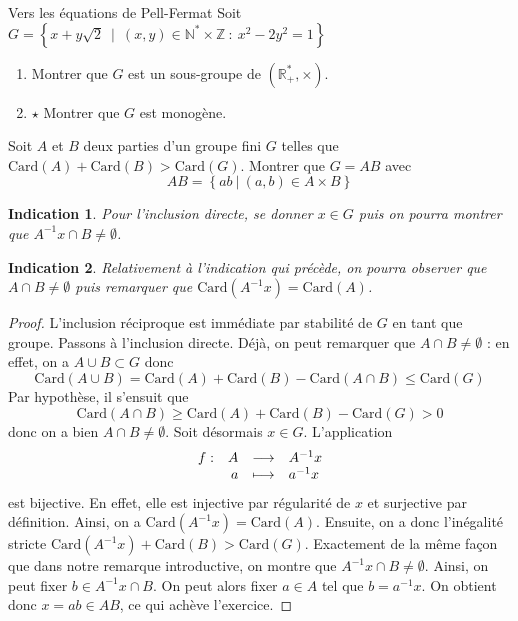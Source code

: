 \documentclass[french,a4paper]{article}
\newcommand{\N}{\mathbb{N}}
\newcommand{\Z}{\mathbb{Z}}
\newcommand{\R}{\mathbb{R}}
\newcommand{\st}{^*}
\newcommand{\inv}{^{-1}}
\newcommand{\card}{\text{Card}}
\theoremstyle{plain}
\newtheorem*{ind}{Indication}
\theoremstyle{definition}
\theoremstyle{remark}
\begin{document}
\begin{ex}[Moulin.AG.11]{Vers les équations de Pell-Fermat}
	Soit $G=\left\{x+y\sqrt{2}\ \mid \ (x,y)\in\N\st\times\Z\ : \ x^2-2y^2=1\right\}$
	\begin{enumerate}
		\item Montrer que $G$ est un sous-groupe de $(\R_+\st,\times)$.
		\item $\star$ Montrer que $G$ est monogène.
	\end{enumerate}
\end{ex}

\begin{ex}{}
	Soit $A$ et $B$ deux parties d'un groupe fini $G$ telles que $\card(A)+\card(B)>\card(G)$. Montrer que $G=AB$ avec $$AB=\left\{ab \ |\ (a,b)\in A\times B\right\}$$
\end{ex}

\begin{ind}
	Pour l'inclusion directe, se donner $x \in G$ puis on pourra montrer que $A\inv x \cap B \ne \emptyset$.
\end{ind}

\begin{ind}
	Relativement à l'indication qui précède, on pourra observer que $A\cap B \ne \emptyset$ puis remarquer que $\card(A\inv x) = \card(A)$.
\end{ind}

\begin{proof}
	L'inclusion réciproque est immédiate par stabilité de $G$ en tant que groupe. Passons à l'inclusion directe. Déjà, on peut remarquer que $A\cap B \ne \emptyset$ : en effet, on a $A\cup B \subset G$ donc $$\card(A\cup B)=\card(A)+\card(B)-\card(A\cap B) \leqslant\card(G)$$ Par hypothèse, il s'ensuit que $$\card(A\cap B) \geqslant \card(A)+\card(B)-\card(G)>0$$ donc on a bien $A\cap B \ne \emptyset$. Soit désormais $x \in G$. L'application $$
	\begin{array}[t]{lrcl}
		f : & A & \longrightarrow & A\inv x \\
		& a & \longmapsto & a\inv x
	\end{array}
	$$ est bijective. En effet, elle est injective par régularité de $x$ et surjective par définition. Ainsi, on a $\card(A\inv x)=\card(A)$. Ensuite, on a donc l'inégalité stricte $\card(A\inv x)+\card(B) > \card(G)$. Exactement de la même façon que dans notre remarque introductive, on montre que $A\inv x \cap B \ne \emptyset$. Ainsi, on peut fixer $b \in A\inv x \cap B$. On peut alors fixer $a \in A$ tel que $b=a\inv x$. On obtient donc $x=ab \in AB$, ce qui achève l'exercice.
\end{proof}
\end{document}
